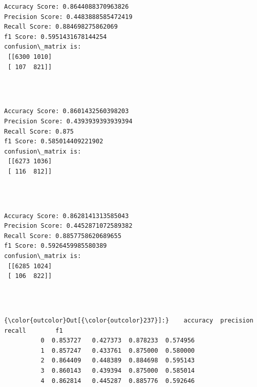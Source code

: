 \documentclass[11pt]{article}
\begin{document}
    \begin{Verbatim}[commandchars=\\\{\}]
Accuracy Score: 0.8644088370963826
Precision Score: 0.4483888585472419
Recall Score: 0.884698275862069
f1 Score: 0.5951431678144254
confusion\_matrix is: 
 [[6300 1010]
 [ 107  821]] 


    \end{Verbatim}


    \begin{center}
    \end{center}
    { \hspace*{\fill} \\}
    
    \begin{Verbatim}[commandchars=\\\{\}]
Accuracy Score: 0.8601432560398203
Precision Score: 0.4393939393939394
Recall Score: 0.875
f1 Score: 0.585014409221902
confusion\_matrix is: 
 [[6273 1036]
 [ 116  812]] 


    \end{Verbatim}



    \begin{center}
    \end{center}
    { \hspace*{\fill} \\}
    
    \begin{Verbatim}[commandchars=\\\{\}]
Accuracy Score: 0.8628141313585043
Precision Score: 0.4452871072589382
Recall Score: 0.8857758620689655
f1 Score: 0.5926459985580389
confusion\_matrix is: 
 [[6285 1024]
 [ 106  822]] 


    \end{Verbatim}

   

    \begin{center}
    \end{center}
    { \hspace*{\fill} \\}
    
\begin{Verbatim}[commandchars=\\\{\}]
{\color{outcolor}Out[{\color{outcolor}237}]:}    accuracy  precision    recall        f1
          0  0.853727   0.427373  0.878233  0.574956
          1  0.857247   0.433761  0.875000  0.580000
          2  0.864409   0.448389  0.884698  0.595143
          3  0.860143   0.439394  0.875000  0.585014
          4  0.862814   0.445287  0.885776  0.592646
\end{Verbatim}
            
\end{document}
